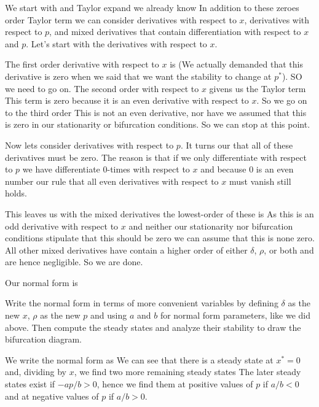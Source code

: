 \solution 
We start with 
and Taylor expand we already know
In addition to these zeroes order Taylor term we can consider derivatives with respect to $x$, derivatives with respect to $p$, and mixed derivatives that contain differentiation with respect to $x$ and $p$. Let's start with the derivatives with respect to $x$.

The first order derivative with respect to $x$ is
(We actually demanded that this derivative is zero when we said that we want the stability to change at $p^*$). SO we need to go on. The second order with respect to $x$ givens us the Taylor term 
This term is zero because it is an even derivative with respect to $x$. So we go on to the third order 
This is not an even derivative, nor have we assumed that this is zero in our stationarity or bifurcation conditions. So we can stop at this point. 

Now lets consider derivatives with respect to $p$. It turns our that all of these derivatives must be zero. The reason is that if we only differentiate with respect to $p$ we have differentiate 0-times with respect to $x$ and because $0$ is an even number our rule that all even derivatives with respect to $x$ must vanish still holds. 

This leaves us with the mixed derivatives the lowest-order of these is 
As this is an odd derivative with respect to $x$ and neither our stationarity nor bifurcation conditions stipulate that this should be zero we can assume that this is none zero. All other mixed derivatives have contain a higher order of either $\delta$, $\rho$, or both and are hence negligible. So we are done. 

Our normal form is 

\subquestion Write the normal form in terms of more convenient variables by defining $\delta$ as the new $x$, $\rho$ as the new $p$ and using $a$ and $b$ for normal form parameters, like we did above. Then compute the steady states and analyze their stability to draw the bifurcation diagram.

\solution
We write the normal form as 
We can see that there is a steady state at $x^*=0$ and, dividing by $x$, we find two more remaining steady states 
The later steady states exist if $-ap/b>0$, hence we find them at positive values of $p$ if $a/b<0$ and at negative values of $p$ if $a/b>0$.

